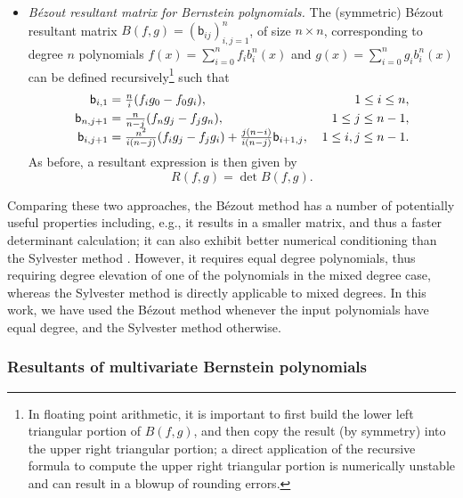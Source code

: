 \documentclass[onefignum,onetabnum,onealgnum,oneeqnum]{siamart190516}
\begin{document}
\begin{itemize}
\item \textit{B\'ezout resultant matrix for Bernstein polynomials.} The (symmetric) B\'ezout resultant matrix $B(f,g) = ({\mathsf b}_{ij})_{i,j=1}^n$, of size $n \times n$, corresponding to degree $n$ polynomials $f(x) = \sum_{i=0}^n f_i b_i^n(x)$ and $g(x) = \sum_{i=0}^n g_i b_i^n(x)$ can be defined recursively\footnote{In floating point arithmetic, it is important to first build the lower left triangular portion of $B(f,g)$, and then copy the result (by symmetry) into the upper right triangular portion; a direct application of the recursive formula to compute the upper right triangular portion is numerically unstable and can result in a blowup of rounding errors.} \cite{BINI2004319} such that
\begin{align*}
 {\mathsf b}_{i,1} &= \smash{\tfrac{n}{i}} (f_i g_0 - f_0 g_i), &  1 \leq i \leq n , \\
 {\mathsf b}_{n,j+1} &= \smash{\tfrac{n}{n - j}} (f_n g_j - f_j g_n), &  \quad 1 \leq j \leq n - 1, \\
 {\mathsf b}_{i,j+1} &= \smash{\tfrac{n^2}{i(n - j)}} ( f_i g_j - f_j g_i ) + \smash{\tfrac{ j(n - i) }{i(n - j)}} {\mathsf b}_{i+1,j}, & 1 \leq i, j \leq n - 1.
\end{align*}
%
As before, a resultant expression is then given by
\[ R(f,g) = \det B(f,g). \]
\end{itemize}
Comparing these two approaches, the B\'ezout method has a number of potentially useful properties including, e.g., it results in a smaller matrix, and thus a faster determinant calculation; it can also exhibit better numerical conditioning than the Sylvester method \cite{WINKLER2013410}. However, it requires equal degree polynomials, thus requiring degree elevation of one of the polynomials in the mixed degree case, whereas the Sylvester method is directly applicable to mixed degrees. In this work, we have used the B\'ezout method whenever the input polynomials have equal degree, and the Sylvester method otherwise.

%

\subsubsection{Resultants of multivariate Bernstein polynomials} 
\label{subsec:resultants}
\end{document}
